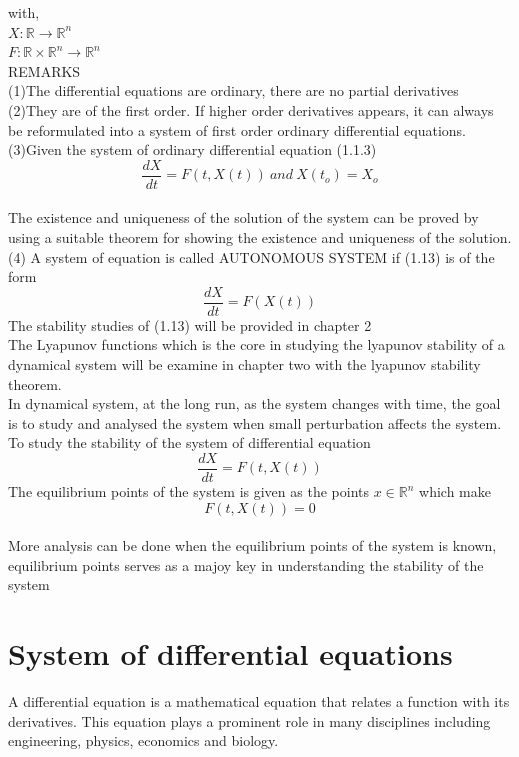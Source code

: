 \documentclass[a4paper,12pt]{report}
\numberwithin{equation}{section}
\begin{document}
with, \\
$X: \mathbb{R}\longrightarrow \mathbb{R}^n$ \\ 
$F:\mathbb{R} \times \mathbb{R}^n \longrightarrow \mathbb{R}^n$ \\
REMARKS\\
(1)The differential equations are ordinary, there are no partial derivatives \\
(2)They are of the first order. If higher order derivatives appears, it can always be reformulated into a system of first order ordinary differential equations. \\
(3)Given the system of ordinary differential equation (1.1.3) \\
\begin{equation}
\frac{dX}{dt}= F(t,X(t)) \ and \ X(t_o)=X_o
\end{equation} \\
The existence and uniqueness of the solution of the system can be proved by using a suitable theorem for showing the existence and uniqueness of the solution. \\
(4) A system of equation is called AUTONOMOUS SYSTEM if (1.13) is of the form 
 \begin{equation}
 \frac{dX}{dt}=F(X(t))
 \end{equation}
 The stability studies of (1.13) will be provided in chapter 2 \\
 The Lyapunov functions which is the core in studying the lyapunov stability of a dynamical system will be examine in chapter two with the lyapunov stability theorem. \\
In dynamical system, at the long run, as the system changes with time, the goal is to study and analysed the system when small perturbation affects the system. To study the stability of the system of differential equation \\
\begin{equation*}
\frac{dX}{dt}=F(t,X(t))
\end{equation*}
 The equilibrium points of the system is given as the points $x \in \mathbb{R}^n$ which make 
 \begin{equation*}
 F(t,X(t))= 0
\end{equation*} \\
More analysis can be done when the equilibrium points of the system is known, equilibrium points serves as a majoy key in understanding the stability of the system 
\section{System of differential equations}
A differential equation is a mathematical equation that relates a function with its derivatives. This equation plays a prominent role in many disciplines including engineering, physics, economics and biology.
\end{document}
